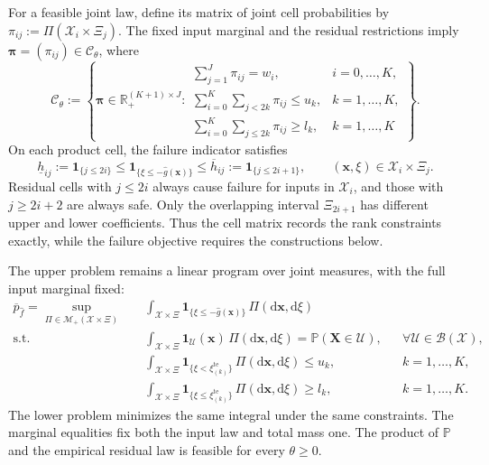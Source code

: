 \documentclass[review,11pt,3p,authoryear,nopreprintline]{elsarticle}
\begin{document}
For a feasible joint law, define its matrix of joint cell probabilities by $\pi_{ij}:=\Pi(\mathcal X_i\times\Xi_j)$. The fixed input marginal and the residual restrictions imply $\bm\pi=(\pi_{ij})\in\mathcal C_\theta$, where
\begin{equation}
  \mathcal C_\theta:=\left\{\bm\pi\in\mathbb R_+^{(K+1)\times J}:
  \begin{array}{ll}
    \displaystyle\sum_{j=1}^{J}\pi_{ij}=w_i,&i=0,\ldots,K,\\[1mm]
    \displaystyle\sum_{i=0}^{K}\sum_{j<2k}\pi_{ij}\le u_k,&k=1,\ldots,K,\\[1mm]
    \displaystyle\sum_{i=0}^{K}\sum_{j\le2k}\pi_{ij}\ge l_k,&k=1,\ldots,K
  \end{array}\right\}.
  \label{eq-cell-mass-polytope}
\end{equation}
On each product cell, the failure indicator satisfies
\begin{equation}
  \underline h_{ij}:=\mathbf1_{\{j\le2i\}}
  \le\mathbf1_{\{\xi\le-\hat g(\bm x)\}}
  \le\overline h_{ij}:=\mathbf1_{\{j\le2i+1\}},
  \qquad (\bm x,\xi)\in\mathcal X_i\times\Xi_j.
  \label{eq-cell-costs}
\end{equation}
Residual cells with $j\le2i$ always cause failure for inputs in $\mathcal X_i$, and those with $j\ge2i+2$ are always safe. Only the overlapping interval $\Xi_{2i+1}$ has different upper and lower coefficients. Thus the cell matrix records the rank constraints exactly, while the failure objective requires the constructions below.

The upper problem remains a linear program over joint measures, with the full input marginal fixed:
\begin{equation}
  \begin{aligned}
    \overline p_{\hat f}
    =\sup_{\Pi\in\mathcal M_+(\mathcal X\times\Xi)}\quad&
      \int_{\mathcal X\times\Xi}\mathbf1_{\{\xi\le-\hat g(\bm x)\}}\,\Pi(\mathrm d\bm x,\mathrm d\xi)\\
    \text{s.t.}\quad&
      \int_{\mathcal X\times\Xi}\mathbf1_{\mathcal U}(\bm x)\,\Pi(\mathrm d\bm x,\mathrm d\xi)
        =\mathbb P(\bm X\in\mathcal U),&&\forall\mathcal U\in\mathcal B(\mathcal X),\\
    &\int_{\mathcal X\times\Xi}\mathbf1_{\{\xi<\xi_{(k)}^{\mathrm{te}}\}}\,\Pi(\mathrm d\bm x,\mathrm d\xi)\le u_k,
        &&k=1,\ldots,K,\\
    &\int_{\mathcal X\times\Xi}\mathbf1_{\{\xi\le\xi_{(k)}^{\mathrm{te}}\}}\,\Pi(\mathrm d\bm x,\mathrm d\xi)\ge l_k,
        &&k=1,\ldots,K.
  \end{aligned}
  \label{eq-measure-upper}
\end{equation}
The lower problem minimizes the same integral under the same constraints. The marginal equalities fix both the input law and total mass one. The product of $\mathbb P$ and the empirical residual law is feasible for every $\theta\ge0$.
\end{document}
